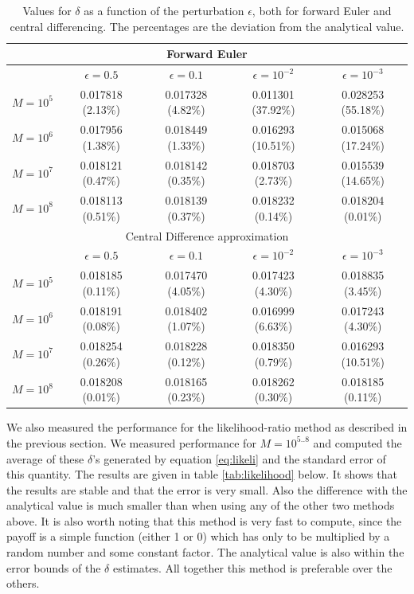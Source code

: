 \documentclass[11pt,a4paper]{article}
\begin{document}
\begin{table}[H]
  \centering
  \begin{tabular}{l || c | c | c | c}
    \hline
    \multicolumn{5}{c}{Forward Euler} \\
    \hline
    & $\epsilon = 0.5$ & $\epsilon = 0.1$ & $\epsilon = 10^{-2}$ & $\epsilon = 10^{-3}$ \\
    \hline
    $M = 10^5$ & 0.017818 (2.13\%) & 0.017328 (4.82\%) & 0.011301 (37.92\%) & 0.028253 (55.18\%) \\
    $M = 10^6$ & 0.017956 (1.38\%) & 0.018449 (1.33\%) & 0.016293 (10.51\%) & 0.015068 (17.24\%) \\
    $M = 10^7$ & 0.018121 (0.47\%) & 0.018142 (0.35\%) & 0.018703 (2.73\%) & 0.015539 (14.65\%) \\
    $M = 10^8$ & 0.018113 (0.51\%) & 0.018139 (0.37\%) & 0.018232 (0.14\%) & 0.018204 (0.01\%)\\
    \hline
    \multicolumn{5}{c}{Central Difference approximation} \\
    \hline
    & $\epsilon = 0.5$ & $\epsilon = 0.1$ & $\epsilon = 10^{-2}$ & $\epsilon = 10^{-3}$ \\
    \hline
    $M = 10^5$ & 0.018185 (0.11\%) & 0.017470 (4.05\%) & 0.017423 (4.30\%) & 0.018835 (3.45\%) \\
    $M = 10^6$ & 0.018191 (0.08\%) & 0.018402 (1.07\%) & 0.016999 (6.63\%) & 0.017243 (4.30\%) \\
    $M = 10^7$ & 0.018254 (0.26\%) & 0.018228 (0.12\%) & 0.018350 (0.79\%) & 0.016293 (10.51\%) \\
    $M = 10^8$ & 0.018208 (0.01\%) & 0.018165 (0.23\%) & 0.018262 (0.30\%) & 0.018185 (0.11\%)\\
  \end{tabular}
  \caption{Values for $\delta$ as a function of the perturbation $\epsilon$, both for forward Euler and central differencing. The percentages are the deviation from the analytical value.}
  \label{tab:deltadigital}
\end{table}

We also measured the performance for the likelihood-ratio method as described in the previous section. We measured performance for $M = 10^{5..8}$ and computed the average of these $\delta$'s generated by equation \ref{eq:likeli} and the standard error of this quantity. The results are given in table \ref{tab:likelihood} below. It shows that the results are stable and that the error is very small. Also the difference with the analytical value is much smaller than when using any of the other two methods above. It is also worth noting that this method is very fast to compute, since the payoff is a simple function (either 1 or 0) which has only to be multiplied by a random number and some constant factor. The analytical value is also within the error bounds of the $\delta$ estimates. All together this method is preferable over the others.
\end{document}
